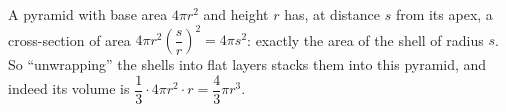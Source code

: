 A pyramid with base area $4\pi r^2$ and height $r$ has, at distance $s$ from its apex, a cross-section of area $4\pi r^2\left(\dfrac sr\right)^2=4\pi s^2$: exactly the area of the shell of radius $s$. So ``unwrapping'' the shells into flat layers stacks them into this pyramid, and indeed its volume is $\dfrac13\cdot4\pi r^2\cdot r=\dfrac43\pi r^3$.

